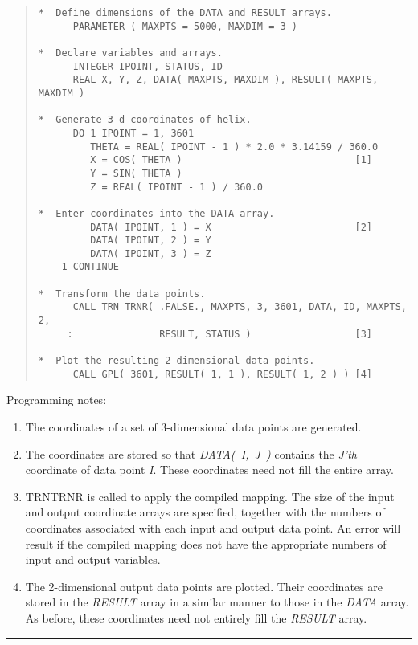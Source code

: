 \documentclass[twoside,11pt]{article}
\renewcommand{\_}{\texttt{\symbol{95}}}
\newcommand{\name}[1]{\mbox{\small{#1}}}
\newcommand{\fortvar}[1]{\mbox{\emph{#1}}}
\newcommand{\exampledone}[0]{\begin{center} \rule{6em}{0.2mm} \end{center}}
\begin{document}
\begin{quote}
\begin{verbatim}
*  Define dimensions of the DATA and RESULT arrays.
      PARAMETER ( MAXPTS = 5000, MAXDIM = 3 )

*  Declare variables and arrays.
      INTEGER IPOINT, STATUS, ID
      REAL X, Y, Z, DATA( MAXPTS, MAXDIM ), RESULT( MAXPTS, MAXDIM )

*  Generate 3-d coordinates of helix.
      DO 1 IPOINT = 1, 3601
         THETA = REAL( IPOINT - 1 ) * 2.0 * 3.14159 / 360.0
         X = COS( THETA )                              [1]
         Y = SIN( THETA )
         Z = REAL( IPOINT - 1 ) / 360.0

*  Enter coordinates into the DATA array.
         DATA( IPOINT, 1 ) = X                         [2]
         DATA( IPOINT, 2 ) = Y
         DATA( IPOINT, 3 ) = Z
    1 CONTINUE

*  Transform the data points.
      CALL TRN_TRNR( .FALSE., MAXPTS, 3, 3601, DATA, ID, MAXPTS, 2,
     :               RESULT, STATUS )                  [3]

*  Plot the resulting 2-dimensional data points.
      CALL GPL( 3601, RESULT( 1, 1 ), RESULT( 1, 2 ) ) [4]

\end{verbatim}
\end{quote}

Programming notes:

\begin{enumerate}

\item The coordinates of a set of 3-dimensional data points are generated.

\item The coordinates are stored so that \fortvar{DATA( I, J )} contains the
\fortvar{J'th} coordinate of data point \fortvar{I}.
These coordinates need not fill the entire array.

\item \name{TRN\_TRNR} is called to apply the compiled mapping.
The size of the input and output coordinate arrays are specified, together
with the numbers of coordinates associated with each input and output data
point.
An error will result if the compiled mapping does not have the appropriate
numbers of input and output variables.

\item The 2-dimensional output data points are plotted.
Their coordinates are stored in the \fortvar{RESULT} array in a similar
manner to those in the \fortvar{DATA} array.
As before, these coordinates need not entirely fill the \fortvar{RESULT}
array.

\end{enumerate}
\exampledone
\end{document}

